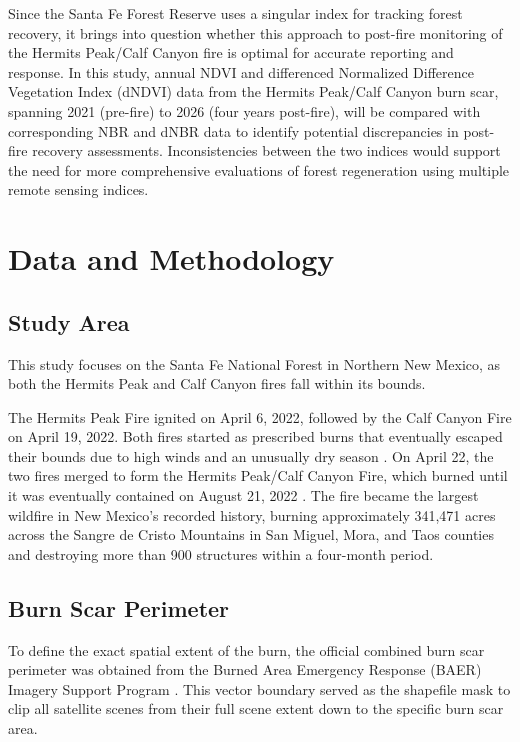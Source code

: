 \documentclass[11pt]{article}
\begin{document}
Since the Santa Fe Forest Reserve uses a singular index for tracking forest recovery, it brings into question whether this approach to post-fire monitoring of the Hermits Peak/Calf Canyon fire is optimal for accurate reporting and response. In this study, annual NDVI and differenced Normalized Difference Vegetation Index (dNDVI) data from the Hermits Peak/Calf Canyon burn scar, spanning 2021 (pre-fire) to 2026 (four years post-fire), will be compared with corresponding NBR and dNBR data to identify potential discrepancies in post-fire recovery assessments. Inconsistencies between the two indices would support the need for more comprehensive evaluations of forest regeneration using multiple remote sensing indices.

\section{Data and Methodology}

\subsection{Study Area}

This study focuses on the Santa Fe National Forest in Northern New Mexico, as both the Hermits Peak and Calf Canyon fires fall within its bounds.

The Hermits Peak Fire ignited on April 6, 2022, followed by the Calf Canyon Fire on April 19, 2022. Both fires started as prescribed burns that eventually escaped their bounds due to high winds and an unusually dry season \cite{frontiersinFire}. On April 22, the two fires merged to form the Hermits Peak/Calf Canyon Fire, which burned until it was eventually contained on August 21, 2022 \cite{nmfwriMonitoring}. The fire became the largest wildfire in New Mexico's recorded history, burning approximately 341,471 acres \cite{nrcsHermits} across the Sangre de Cristo Mountains in San Miguel, Mora, and Taos counties and destroying more than 900 structures within a four-month period.

\subsection{Burn Scar Perimeter}

To define the exact spatial extent of the burn, the official combined burn scar perimeter was obtained from the Burned Area Emergency Response (BAER) Imagery Support Program \cite{baerImagery}. This vector boundary served as the shapefile mask to clip all satellite scenes from their full scene extent down to the specific burn scar area.
\end{document}
